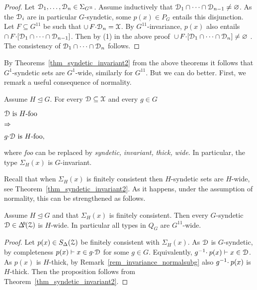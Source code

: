 \begin{proof}
  \def\medrel#1{\parbox[t]{5ex}{$\displaystyle\hfil #1$}}
  \def\ceq#1#2#3{\parbox[t]{23ex}{$\displaystyle #1$}\medrel{#2}{$\displaystyle #3$}}   
  Let $\EuScript D_1,\dots,\EuScript D_n\in\Sigma_{G^{1\!1}}$.
  Assume inductively that $\EuScript D_1\cap\dots\cap\EuScript D_{n-1}\neq\varnothing$.
  As the $\EuScript D_i$ are in particular $G$-syndetic, some $p(x)\in P_G$ entails this disjunction.
  Let $F\subseteq G^{1\!1}$ be such that $\cup\,F{\cdot}\EuScript D_n=\EuScript X$.
  By $G^{1\!1}$-invariance, $p(x)$ also entails $\cap\, F{\cdot}[\EuScript D_1\cap\dots\cap\EuScript D_{n-1}]$.
  Then by (1) in the above proof $\,\cup\,F{\cdot}[\EuScript D_1\cap\dots\cap\EuScript D_n]\neq\varnothing$ .
  The consistency of $\EuScript D_1\cap\dots\cap\EuScript D_n$ follows.
\end{proof}

By Theorems~\ref{thm_syndetic_invariant2} from the above theorems it follows that $G^1$-syndetic sets are $G^1$-wide, similarly for $G^{1\!1}$.
But we can do better.
First, we remark a useful consequence of normality.

\begin{remark}\label{rem_invariance_normalsubg}
\def\medrel#1{\parbox[t]{5ex}{$\displaystyle\hfil #1$}}
\def\ceq#1#2#3{\parbox[t]{20ex}{$\displaystyle #1$}\medrel{#2}{$\displaystyle #3$}}
  Assume $H\trianglelefteq G$.
  For every $\EuScript D\subseteq\EuScript X$ and every $g\in G$ \smallskip
  
  \ceq{\hfill\D\textrm{ is }H\textrm{-foo}}{\Rightarrow}{g{\cdot}\D\textrm{ is }H\textrm{-foo},} \smallskip
  
  where \textit{foo\/} can be replaced by \textit{syndetic,} \textit{invariant,} \textit{thick,} \textit{wide.}
  In particular, the type $\Sigma_H(x)$ is $G$-invariant.
\end{remark}

Recall that when $\Sigma_H(x)$ is finitely consistent then $H$-syndetic sets are $H$-wide, see Theorem~\ref{thm_syndetic_invariant2}.
As it happens, under the assumption of normality, this can be strengthened as follows.

\begin{proposition}\label{prop_Gsyndetic_Hthick1}
  Assume $H\trianglelefteq G$ and that $\Sigma_H(x)$ is finitely consistent.
  Then every $G$-syn\-detic $\D\in\BDelta(\Z)$ is $H$-wide.
  In particular all types in $Q_G$ are $G^{1\!1}$-wide.
\end{proposition}

\begin{proof}
  Let $p(x)\in S_\Delta(\EuScript Z)$ be finitely consistent with $\Sigma_H(x)$.
  As $\EuScript D$ is $G$-syndetic, by completeness $p(x)\vdash x\in g{\cdot}\EuScript D$ for some $g\in G$.
  Equivalently, $g^{-1}\kern-.5ex\cdot p(x)\vdash x\in\EuScript D$.
  As $p(x)$ is $H$-thick, by Remark~\ref{rem_invariance_normalsubg} also $g^{-1}\kern-.5ex\cdot p(x)$ is $H$-thick.
  Then the proposition follows from Theorem~\ref{thm_syndetic_invariant2}.
\end{proof}

